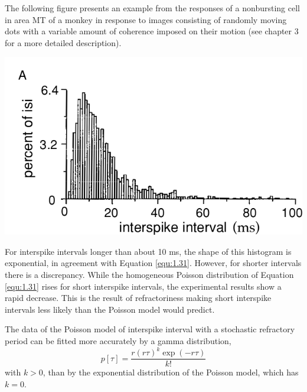 \begin{exm}
  The following figure presents an example from the responses of a nonbursting cell in area MT of a monkey in response to images consisting of randomly moving dots with a variable amount of coherence imposed on
  their motion (see chapter $3$ for a more detailed description).
  \begin{center}
    \label{fig:1.15A}    
    \includegraphics[trim=30 0 0 60,clip,scale = 0.36]{png/Figure1-15-A.png}\\        
  \end{center}
  For interspike intervals longer than about 10 ms, the shape of this histogram is exponential, in agreement with Equation \ref{equ:1.31}. However, for shorter intervals there is a discrepancy. While the homogeneous Poisson distribution of Equation \ref{equ:1.31} rises for short interspike intervals, the experimental results show a rapid decrease. This is the result of refractoriness making short interspike intervals less likely than the Poisson model would predict.
\end{exm}

\begin{prop}
    The data of the Poisson model of interspike interval with a stochastic refractory period can be fitted more accurately by a gamma distribution, 
    \begin{equation}
        p[\tau] = \frac{r(r\tau)^k\exp(-r\tau)}{k!}
        \label{equ:1.39}
    \end{equation}
    with $k>0$, than by the exponential distribution of the Poisson model, which has $k = 0$.
\end{prop}

